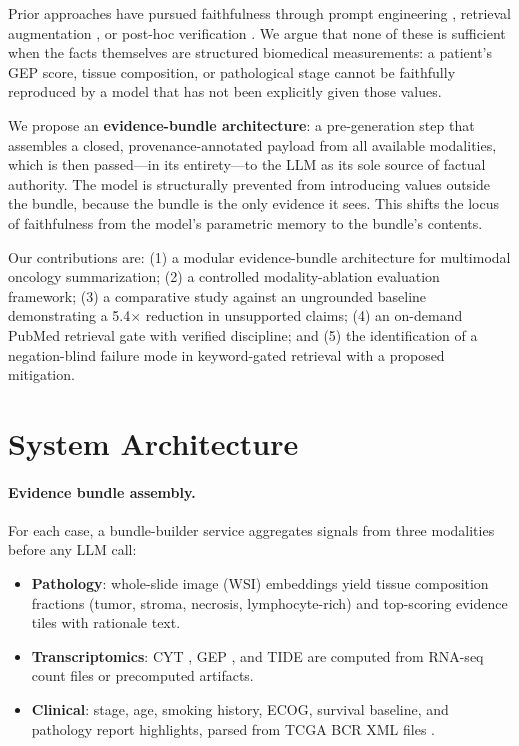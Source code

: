\documentclass[11pt,twocolumn]{article}
\begin{document}
Prior approaches have pursued faithfulness through prompt engineering
\cite{rawte2023survey}, retrieval augmentation \cite{lewis2020rag}, or
post-hoc verification \cite{min2023factscore}. We argue that none of
these is sufficient when the facts themselves are structured biomedical
measurements: a patient's GEP score, tissue composition, or pathological
stage cannot be faithfully reproduced by a model that has not been
explicitly given those values.

We propose an \textbf{evidence-bundle architecture}: a pre-generation
step that assembles a closed, provenance-annotated payload from all
available modalities, which is then passed—in its entirety—to the LLM as
its sole source of factual authority. The model is structurally
prevented from introducing values outside the bundle, because the bundle
is the only evidence it sees. This shifts the locus of faithfulness from
the model's parametric memory to the bundle's contents.

Our contributions are: (1) a modular evidence-bundle architecture for
multimodal oncology summarization; (2) a controlled modality-ablation
evaluation framework; (3) a comparative study against an ungrounded
baseline demonstrating a 5.4$\times$ reduction in unsupported claims;
(4) an on-demand PubMed retrieval gate with verified discipline; and (5)
the identification of a negation-blind failure mode in keyword-gated
retrieval with a proposed mitigation.

\section{System Architecture}

\paragraph{Evidence bundle assembly.}
For each case, a bundle-builder service aggregates signals from three
modalities before any LLM call:

\begin{itemize}
  \setlength\itemsep{1pt}
  \item \textbf{Pathology}: whole-slide image (WSI) embeddings \cite{chen2022hipt}
    yield tissue composition fractions (tumor, stroma, necrosis,
    lymphocyte-rich) and top-scoring evidence tiles with rationale text.
  \item \textbf{Transcriptomics}: CYT \cite{rooney2015molecular},
    GEP \cite{ayers2017ifng}, and TIDE \cite{jiang2018signatures}
    are computed from RNA-seq count files or precomputed artifacts.
  \item \textbf{Clinical}: stage, age, smoking history, ECOG, survival
    baseline, and pathology report highlights, parsed from TCGA BCR XML
    files \cite{tcga2014luad}.
\end{itemize}
\end{document}
